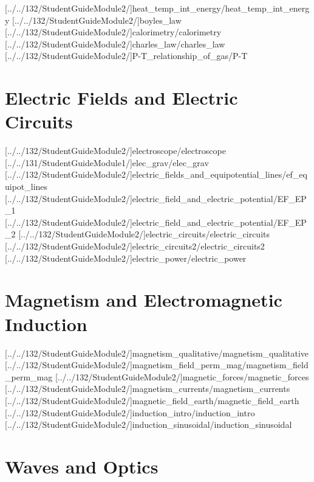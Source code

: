 \documentclass[english,twoside]{article}
\begin{document}
[../../132/StudentGuideModule2/]{heat_temp_int_energy/heat_temp_int_energy}
[../../132/StudentGuideModule2/]{boyles_law}
[../../132/StudentGuideModule2/]{calorimetry/calorimetry}
[../../132/StudentGuideModule2/]{charles_law/charles_law}
[../../132/StudentGuideModule2/]{P-T_relationship_of_gas/P-T}

\part{Electric Fields and Electric Circuits}

[../../132/StudentGuideModule2/]{electroscope/electroscope}
[../../131/StudentGuideModule1/]{elec_grav/elec_grav}
[../../132/StudentGuideModule2/]{electric_fields_and_equipotential_lines/ef_equipot_lines}
[../../132/StudentGuideModule2/]{electric_field_and_electric_potential/EF_EP_1}
[../../132/StudentGuideModule2/]{electric_field_and_electric_potential/EF_EP_2}
[../../132/StudentGuideModule2/]{electric_circuits/electric_circuits}
[../../132/StudentGuideModule2/]{electric_circuits2/electric_circuits2}
[../../132/StudentGuideModule2/]{electric_power/electric_power}

\part{Magnetism and Electromagnetic Induction}

[../../132/StudentGuideModule2/]{magnetism_qualitative/magnetism_qualitative}
[../../132/StudentGuideModule2/]{magnetism_field_perm_mag/magnetism_field_perm_mag}
[../../132/StudentGuideModule2/]{magnetic_forces/magnetic_forces} 
[../../132/StudentGuideModule2/]{magnetism_currents/magnetism_currents} %
[../../132/StudentGuideModule2/]{magnetic_field_earth/magnetic_field_earth}
[../../132/StudentGuideModule2/]{induction_intro/induction_intro}
[../../132/StudentGuideModule2/]{induction_sinusoidal/induction_sinusoidal} %

\part{Waves and Optics}
\end{document}
